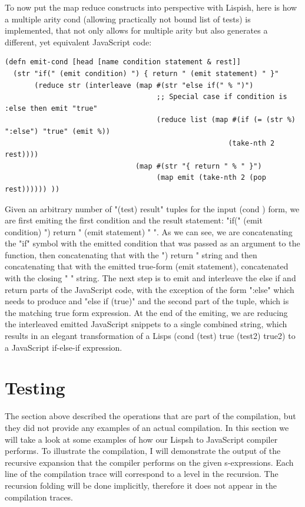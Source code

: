 To now put the map reduce constructs into perspective with Lispish, here is how a multiple arity cond (allowing practically not bound list of tests) is implemented, that not only allows for multiple arity but also generates a different, yet equivalent JavaScript code: 

\begin{verbatim}
(defn emit-cond [head [name condition statement & rest]]
  (str "if(" (emit condition) ") { return " (emit statement) " }"
       (reduce str (interleave (map #(str "else if(" % ")")
                                    ;; Special case if condition is :else then emit "true"
                                    (reduce list (map #(if (= (str %) ":else") "true" (emit %))
                                                     (take-nth 2 rest))))
                               (map #(str "{ return " % " }")
                                    (map emit (take-nth 2 (pop rest)))))) ))
\end{verbatim}

Given an arbitrary number of "(test) result" tuples for the input (cond ) form, we are first emiting the first condition and the result statement: "if(" (emit condition) ") { return " (emit statement) " }". As we can see, we are concatenating the "if" symbol with the emitted condition that was passed as an argument to the function, then concatenating that with the ") { return " string and then concatenating that with the emitted true-form (emit statement), concatenated with the closing " }" string. 
The next step is to emit and interleave the else if and return parts of the JavaScript code, with the exception of the form ":else" which needs to produce and "else if (true)" and the second part of the tuple, which is the matching true form expression.
At the end of the emiting, we are reducing the interleaved emitted JavaScript snippets to a single combined string, which results in an elegant transformation of a Lisps (cond (test) true (test2) true2) to a JavaScript if-else-if expression.

\section{Testing}
The section above described the operations that are part of the compilation, but they did not provide any examples of an actual compilation. 
In this section we will take a look at some examples of how our Lispsh to JavaScript compiler performs. 
To illustrate the compilation, I will demonstrate the output of the recursive expansion that the compiler performs on the given s-expressions. 
Each line of the compilation trace will correspond to a level in the recursion. The recursion folding will be done implicitly, therefore it does not appear in the compilation traces. 

